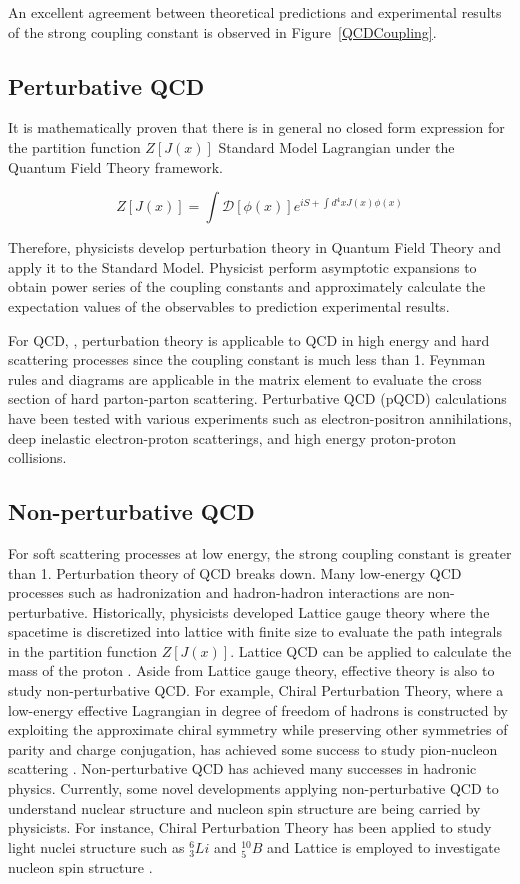 An excellent agreement between theoretical predictions and experimental results of the strong coupling constant is observed in Figure~\ref{QCDCoupling}. 

\subsection{Perturbative QCD}

It is mathematically proven that there is in general no closed form expression for the partition function $Z[J(x)]$ Standard Model Lagrangian under the Quantum Field Theory framework.

\begin{equation}
Z[J(x)] = \int \mathcal{D}[\phi(x)] e^{iS + \int d^4 x J(x) \phi(x)}
\end{equation}

Therefore, physicists develop perturbation theory in Quantum Field Theory and apply it to the Standard Model. Physicist perform asymptotic expansions to obtain power series of the coupling constants and approximately calculate the expectation values of the observables to prediction experimental results.

For QCD, ,  perturbation theory is applicable to QCD in high energy and hard scattering processes since the coupling constant is much less than 1. Feynman rules and diagrams are applicable in the matrix element to evaluate the cross section of hard parton-parton scattering. Perturbative QCD (pQCD) calculations have been tested with various experiments such as electron-positron annihilations, deep inelastic electron-proton scatterings, and high energy proton-proton collisions.

\subsection{Non-perturbative QCD}

For soft scattering processes at low energy, the strong coupling constant is greater than 1. Perturbation theory of QCD breaks down. Many low-energy QCD processes such as hadronization and hadron-hadron interactions are non-perturbative. Historically, physicists developed Lattice gauge theory where the spacetime is discretized into lattice with finite size to evaluate the path integrals in the partition function $Z[J(x)]$. Lattice QCD can be applied to calculate the mass of the proton \cite{LQCDProtonMass}. Aside from Lattice gauge theory, effective theory is also to study non-perturbative QCD. For example, Chiral Perturbation Theory, where a low-energy effective Lagrangian in degree of freedom of hadrons is constructed by exploiting the approximate chiral symmetry while preserving other symmetries of parity and charge conjugation, has achieved some success to study pion-nucleon scattering \cite{ChiPT}. Non-perturbative QCD has achieved many successes in hadronic physics. Currently, some novel developments applying non-perturbative QCD to understand nuclear structure and nucleon spin structure are being carried by physicists. For instance, Chiral Perturbation Theory has been applied to study light nuclei structure such as ${}_{3}^{6}Li$ and ${}_{5}^{10}B$ \cite{ChiPTNuclear} and Lattice is employed to investigate nucleon spin structure \cite{LatticeNuclSpin}. 

